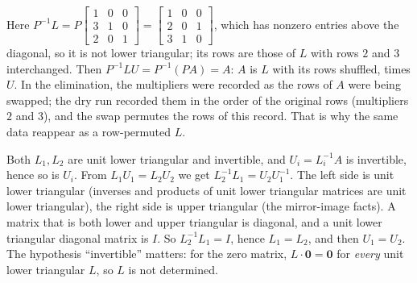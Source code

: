 \documentclass[11pt]{article}
\begin{document}
\begin{description}[leftmargin=0pt,itemsep=5pt]
  \item[Pause and think \ref{think:permL}.] Here $P^{-1}L=P\begin{bmatrix}1&0&0\\3&1&0\\2&0&1\end{bmatrix}=\begin{bmatrix}1&0&0\\2&0&1\\3&1&0\end{bmatrix}$, which has nonzero entries above the diagonal, so it is not lower triangular; its rows are those of $L$ with rows $2$ and $3$ interchanged. Then $P^{-1}LU=P^{-1}(PA)=A$: $A$ is $L$ with its rows shuffled, times $U$. In the elimination, the multipliers were recorded as the rows of $A$ were being swapped; the dry run recorded them in the order of the original rows (multipliers $2$ and $3$), and the swap permutes the rows of this record. That is why the same data reappear as a row-permuted $L$.
  \item[Pause and think \ref{think:unique}.] Both $L_1,L_2$ are unit lower triangular and invertible, and $U_i=L_i^{-1}A$ is invertible, hence so is $U_i$. From $L_1U_1=L_2U_2$ we get $L_2^{-1}L_1=U_2U_1^{-1}$. The left side is unit lower triangular (inverses and products of unit lower triangular matrices are unit lower triangular), the right side is upper triangular (the mirror-image facts). A matrix that is both lower and upper triangular is diagonal, and a unit lower triangular diagonal matrix is $I$. So $L_2^{-1}L_1=I$, hence $L_1=L_2$, and then $U_1=U_2$. The hypothesis ``invertible'' matters: for the zero matrix, $L\cdot\mathbf{0}=\mathbf{0}$ for \emph{every} unit lower triangular $L$, so $L$ is not determined.

\end{description}
\end{document}
